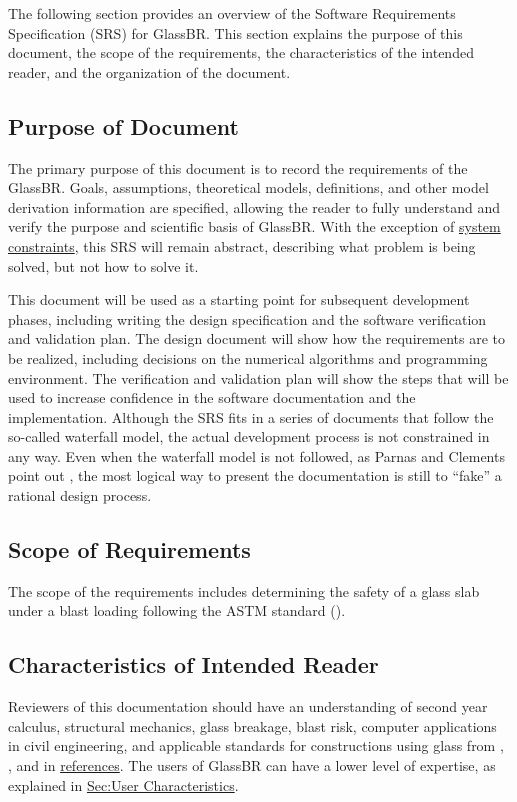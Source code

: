 \documentclass[12pt]{article}
\begin{document}
The following section provides an overview of the Software Requirements Specification (SRS) for GlassBR. This section explains the purpose of this document, the scope of the requirements, the characteristics of the intended reader, and the organization of the document.

\subsection{Purpose of Document}
\label{Sec:DocPurpose}
The primary purpose of this document is to record the requirements of the GlassBR. Goals, assumptions, theoretical models, definitions, and other model derivation information are specified, allowing the reader to fully understand and verify the purpose and scientific basis of GlassBR. With the exception of \hyperref[Sec:SysConstraints]{system constraints}, this SRS will remain abstract, describing what problem is being solved, but not how to solve it.

This document will be used as a starting point for subsequent development phases, including writing the design specification and the software verification and validation plan. The design document will show how the requirements are to be realized, including decisions on the numerical algorithms and programming environment. The verification and validation plan will show the steps that will be used to increase confidence in the software documentation and the implementation. Although the SRS fits in a series of documents that follow the so-called waterfall model, the actual development process is not constrained in any way. Even when the waterfall model is not followed, as Parnas and Clements point out \cite{parnasClements1986}, the most logical way to present the documentation is still to ``fake'' a rational design process.

\subsection{Scope of Requirements}
\label{Sec:ReqsScope}
The scope of the requirements includes determining the safety of a glass slab under a blast loading following the ASTM standard (\cite{astm2009}).

\subsection{Characteristics of Intended Reader}
\label{Sec:ReaderChars}
Reviewers of this documentation should have an understanding of second year calculus, structural mechanics, glass breakage, blast risk, computer applications in civil engineering, and applicable standards for constructions using glass from \cite{astm2009}, \cite{astm2012}, and \cite{astm2016} in \hyperref[Sec:References]{references}. The users of GlassBR can have a lower level of expertise, as explained in \hyperref[Sec:UserChars]{Sec:User Characteristics}.
\end{document}
